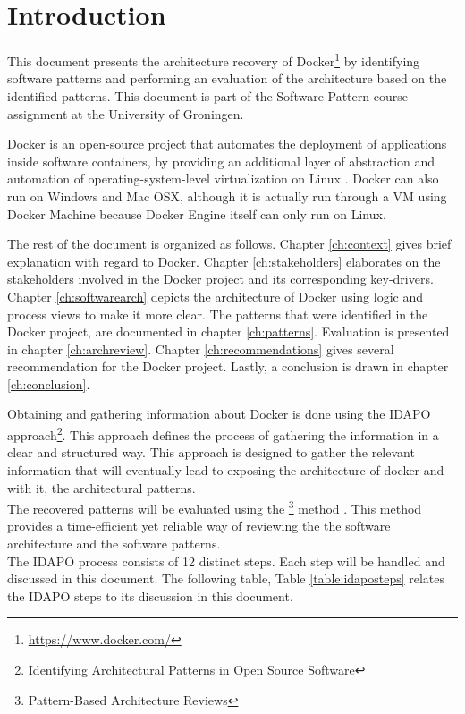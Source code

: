 \clearpage
\chapter{Introduction}
\label{ch:introduction}
This document presents the architecture recovery of
Docker\footnote{\url{https://www.docker.com/}} by identifying software patterns
and performing an evaluation of the architecture based on the identified
patterns. This document is part of the Software Pattern course assignment at the
University of Groningen.

Docker is an open-source project that automates the deployment of applications
inside software containers, by providing an additional layer of abstraction and
automation of operating-system-level virtualization on Linux \cite{dockerdef}.
Docker can also run on Windows and Mac OSX, although it is actually run through
a VM using Docker Machine because Docker Engine itself can only run on Linux.

The rest of the document is organized as follows. Chapter \ref{ch:context}
gives brief explanation with regard to Docker. Chapter \ref{ch:stakeholders}
elaborates on the stakeholders involved in the Docker project and its
corresponding key-drivers. Chapter \ref{ch:softwarearch} depicts the
architecture of Docker using logic and process views to make it more clear.
The patterns that were identified in the Docker project, are documented in chapter
\ref{ch:patterns}. Evaluation is presented in chapter \ref{ch:archreview}.
Chapter \ref{ch:recommendations} gives several recommendation for the Docker
project. Lastly, a conclusion is drawn in chapter \ref{ch:conclusion}.

Obtaining and gathering information about Docker is done using the IDAPO \cite{idapo} approach\footnote{Identifying Architectural Patterns in
Open Source Software}. This approach defines the process of gathering the information in a clear and structured way.
 This approach is designed to gather the relevant information that will eventually lead to exposing the architecture of docker and with it, the architectural patterns. \\
The recovered patterns will be evaluated using the \footnote{Pattern-Based Architecture Reviews} method \cite{pbar}. This method provides a time-efficient yet reliable way of reviewing the the software architecture and the software patterns.\\
The IDAPO process consists of 12 distinct steps. Each step will be handled and discussed in this document. The following table, Table \ref{table:idaposteps} relates the IDAPO steps to its discussion in this document.





